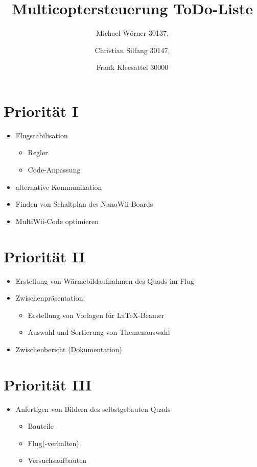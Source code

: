 \documentclass[12pt,a4paper]{article}
\title{Multicoptersteuerung ToDo-Liste}
\begin{document}
\maketitle

\begin{center}
	\author{Michael Wörner 30137, \and Christian Silfang 30147, \and Frank Kleesattel 30000}
\end{center}

\section{Priorität I}

\begin{itemize}
	\item Flugstabilisation
	\begin{itemize}
		\item Regler
		\item Code-Anpassung
	\end{itemize}
	\item alternative Kommunikation 
	\item Finden von Schaltplan des NanoWii-Boards
	\item MultiWii-Code optimieren
\end{itemize}

\section{Priorität II}

\begin{itemize}
	\item Erstellung von Wärmebildaufnahmen des Quads im Flug
	\item Zwischenpräsentation:
	\begin{itemize}
		\item Erstellung von Vorlagen für LaTeX-Beamer
		\item Auswahl und Sortierung von Themenauswahl	
	\end{itemize}		
	\item Zwischenbericht (Dokumentation)
\end{itemize}

\section{Priorität III}

\begin{itemize}
	\item Anfertigen von Bildern des selbstgebauten Quads
	\begin{itemize}
		\item Bauteile
		\item Flug(-verhalten)
		\item Versuchsaufbauten
	\end{itemize}
\end{itemize}
\end{document}
